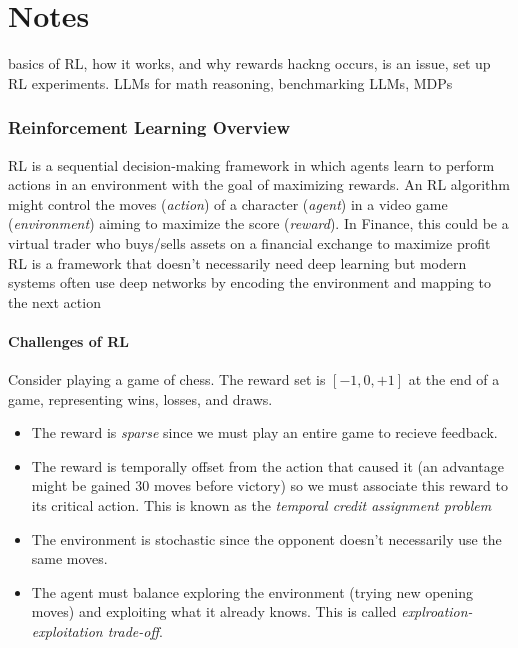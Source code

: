 \documentclass[11pt]{article}
\begin{document}
\newpage
\part{Notes}
basics of RL, how it works, and why rewards hackng occurs, is an issue, set up RL experiments. LLMs for math reasoning, benchmarking LLMs, MDPs

\section{Reinforcement Learning Overview}
RL is a sequential decision-making framework in which agents learn to perform actions in an environment with the goal of maximizing rewards. An RL algorithm might control the moves (\emph{action}) of a character (\emph{agent}) in a video game (\emph{environment}) aiming to maximize the score (\emph{reward}). In Finance, this could be a virtual trader who buys/sells assets on a financial exchange to maximize profit
RL is a framework that doesn't necessarily need deep learning but modern systems often use deep networks by encoding the environment and mapping to the next action
\subsection*{Challenges of RL}
Consider playing a game of chess. The reward set is $[-1, 0, +1]$ at the end of a game, representing wins, losses, and draws. 
\begin{itemize}
    \item The reward is \emph{sparse} since we must play an entire game to recieve feedback.
    \item The reward is temporally offset from the action that caused it (an advantage might be gained 30 moves before victory) so we must associate this reward to its critical action. This is known as the \emph{temporal credit assignment problem}
    \item The environment is stochastic since the opponent doesn't necessarily use the same moves.
    \item The agent must balance exploring the environment (trying new opening moves) and exploiting what it already knows. This is called \emph{explroation-exploitation trade-off}.
\end{itemize}
\end{document}
